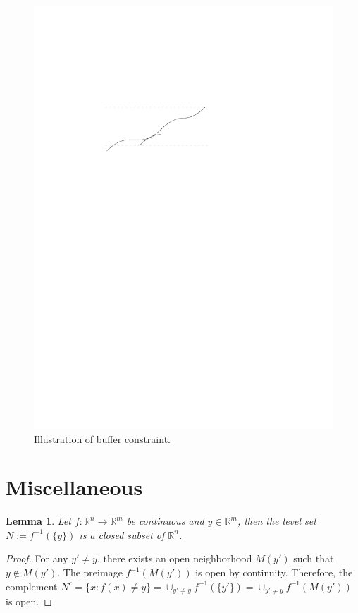 \documentclass[a4paper]{article}
\theoremstyle{definition}
\theoremstyle{plain}
\newtheorem{lemma}{Lemma\hspace{0.25em}\ignorespaces}
\begin{document}
\begin{figure}
  \centering
  \includegraphics[scale=1]{figures/motion/rough/bufferconstraint}
  \caption{Illustration of buffer constraint.}%
  \label{fig:bufferconstraint}
\end{figure}


\newpage
\appendix
\section{Miscellaneous}

\begin{lemma}\label{lemma:levelset}
  Let $f :\mathbb{R}^{n} \rightarrow \mathbb{R}^{m}$ be continuous and
  $y \in \mathbb{R}^{m}$, then the level set $N := f^{-1}(\{ y \})$ is a closed
  subset of $\mathbb{R}^{n}$.
\end{lemma}
\begin{proof}
  For any $y' \neq y$, there exists an open neighborhood $M(y')$ such that
  $y \notin M(y')$. The preimage $f^{-1}(M(y'))$ is open by continuity.
  Therefore, the complement
  $N^{c} = \{ x : f(x) \neq y \} = \cup_{y' \neq y} f^{-1}(\{y'\}) = \cup_{y' \neq y} f^{-1}(M(y'))$
  is open.
\end{proof}
\end{document}
